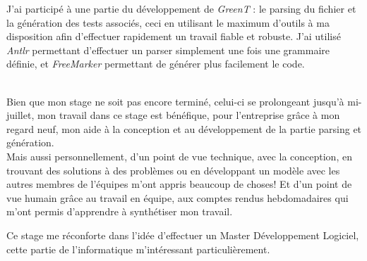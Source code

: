 \documentclass[a4paper, 12pt]{article}
\begin{document}
	J'ai participé à une partie du développement de \textit{GreenT} : le parsing du fichier et la génération des tests associés, ceci en utilisant le maximum d'outils à ma
	disposition afin d'effectuer rapidement un travail fiable et robuste. J'ai utilisé \textit{Antlr} permettant d'effectuer un parser simplement une fois
	une grammaire définie, et \textit{FreeMarker} permettant de générer plus facilement le code.\\~

	Bien que mon stage ne soit pas encore terminé, celui-ci se prolongeant jusqu'à mi-juillet, mon travail dans ce stage est bénéfique, pour l'entreprise grâce à
	mon regard neuf, mon aide à la conception et au développement de la partie parsing et génération.\\
	Mais aussi personnellement, d'un point de vue technique, avec la conception, en trouvant des solutions à des problèmes ou en développant un modèle avec les autres membres de l'équipes m'ont appris beaucoup de
	choses! Et d'un point de vue humain grâce au travail en équipe, aux comptes rendus hebdomadaires qui m'ont permis d'apprendre à synthétiser mon travail.

	Ce stage me réconforte dans l'idée d'effectuer un Master Développement Logiciel, cette partie de l'informatique m'intéressant particulièrement.
\end{document}
